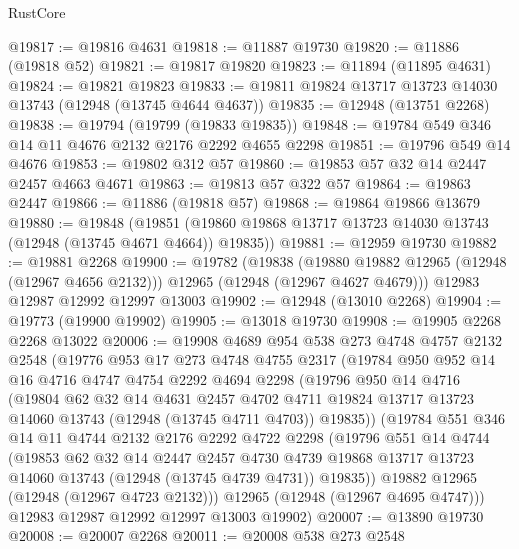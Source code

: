 \begin{lexlean}{RustCore}
\begin{coremodule}
@19817 := @19816 @4631
@19818 := @11887 @19730
@19820 := @11886 (@19818 @52)
@19821 := @19817 @19820
@19823 := @11894 (@11895 @4631)
@19824 := @19821 @19823
@19833 := @19811 @19824 @13717 @13723 @14030 @13743 (@12948 (@13745 @4644 @4637))
@19835 := @12948 (@13751 @2268)
@19838 := @19794 (@19799 (@19833 @19835))
@19848 := @19784 @549 @346 @14 @11 @4676 @2132 @2176 @2292 @4655 @2298
@19851 := @19796 @549 @14 @4676
@19853 := @19802 @312 @57
@19860 := @19853 @57 @32 @14 @2447 @2457 @4663 @4671
@19863 := @19813 @57 @322 @57
@19864 := @19863 @2447
@19866 := @11886 (@19818 @57)
@19868 := @19864 @19866 @13679
@19880 := @19848
    (@19851 (@19860 @19868 @13717 @13723 @14030 @13743 (@12948 (@13745 @4671 @4664)) @19835))
@19881 := @12959 @19730
@19882 := @19881 @2268
@19900 := @19782
    (@19838
      (@19880 @19882 @12965 (@12948 (@12967 @4656 @2132)))
      @12965
      (@12948 (@12967 @4627 @4679)))
    @12983
    @12987
    @12992
    @12997
    @13003
@19902 := @12948 (@13010 @2268)
@19904 := @19773 (@19900 @19902)
@19905 := @13018 @19730
@19908 := @19905 @2268 @2268 @13022
@20006 := @19908
    @4689
    @954
    @538
    @273
    @4748
    @4757
    @2132
    @2548
    (@19776
      @953
      @17
      @273
      @4748
      @4755
      @2317
      (@19784
        @950
        @952
        @14
        @16
        @4716
        @4747
        @4754
        @2292
        @4694
        @2298
        (@19796
          @950
          @14
          @4716
          (@19804
            @62
            @32
            @14
            @4631
            @2457
            @4702
            @4711
            @19824
            @13717
            @13723
            @14060
            @13743
            (@12948 (@13745 @4711 @4703))
            @19835))
        (@19784
          @551
          @346
          @14
          @11
          @4744
          @2132
          @2176
          @2292
          @4722
          @2298
          (@19796
            @551
            @14
            @4744
            (@19853
              @62
              @32
              @14
              @2447
              @2457
              @4730
              @4739
              @19868
              @13717
              @13723
              @14060
              @13743
              (@12948 (@13745 @4739 @4731))
              @19835))
          @19882
          @12965
          (@12948 (@12967 @4723 @2132)))
        @12965
        (@12948 (@12967 @4695 @4747)))
      @12983
      @12987
      @12992
      @12997
      @13003
      @19902)
@20007 := @13890 @19730
@20008 := @20007 @2268
@20011 := @20008 @538 @273 @2548

\end{coremodule}
\end{lexlean}
